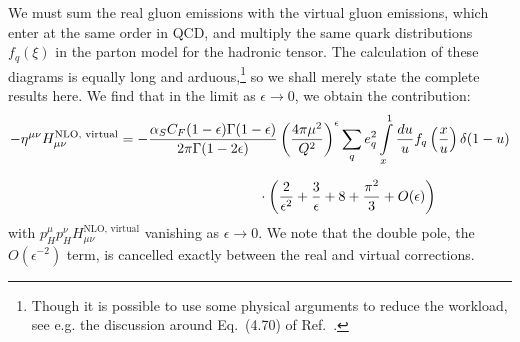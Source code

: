\documentclass[withindex,glossary]{cam-thesis}
\begin{document}
\noindent We must sum the real gluon emissions with the virtual gluon emissions, which enter at the same order in QCD, and multiply the same quark distributions $f_q(\xi)$ in the parton model for the hadronic tensor. The calculation of these diagrams is equally long and arduous,\footnote{Though it is possible to use some physical arguments to reduce the workload, see e.g. the discussion around Eq.~(4.70) of Ref.~\cite{Ellis:1996mzs}.} so we shall merely state the complete results here. We find that in the limit as $\epsilon \rightarrow 0$, we obtain the contribution:
\begin{align}
\label{eq:virtual_transverse_unsimplified}
-\eta^{\mu\nu} H_{\mu\nu}^{\text{NLO, virtual}} &= -\frac{\alpha_S C_F  (1-\epsilon) \Gamma(1-\epsilon)}{2\pi \Gamma(1 - 2\epsilon)} \left( \frac{4\pi \mu^2}{Q^2} \right)^{\epsilon} \sum_{q} e_q^2 \int\limits_{x}^{1} \frac{du}{u} f_q\left( \frac{x}{u} \right) \delta(1-u) \notag\\[1.5ex]
& \qquad\qquad\qquad\qquad\qquad \cdot \left( \frac{2}{\epsilon^2} + \frac{3}{\epsilon} + 8 + \frac{\pi^2}{3} + O(\epsilon)\right)
\end{align}
with $p^{\mu}_H p^{\nu}_H H_{\mu\nu}^{\text{NLO, virtual}}$ vanishing as $\epsilon \rightarrow 0$. We note that the double pole, the $O(\epsilon^{-2})$ term, is cancelled exactly between the real and virtual corrections.\\

\end{document}
